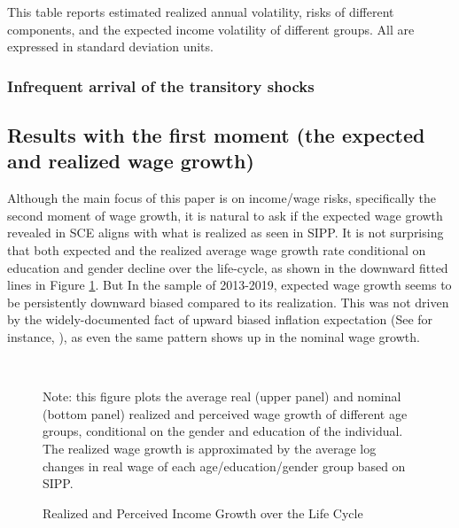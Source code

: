 \begin{table}
{}
	\begin{flushleft} This table reports estimated realized annual volatility, risks of different components, and the expected income volatility of different groups. All are expressed in standard deviation units.\end{flushleft}
\end{table}


\subsubsection{Infrequent arrival of the transitory shocks}

\subsection{Results with the first moment (the expected and realized wage growth)}

Although the main focus of this paper is on income/wage risks, specifically the second moment of wage growth, it is natural to ask if the expected wage growth revealed in SCE aligns with what is realized as seen in SIPP. It is not surprising that both expected and the realized average wage growth rate conditional on education and gender decline over the life-cycle, as shown in the downward fitted lines in Figure \ref{fig:growth_age_compare}. But In the sample of 2013-2019, expected wage growth seems to be persistently downward biased compared to its realization. This was not driven by the widely-documented fact of upward biased inflation expectation (See for instance, \cite{wang2021infvar}), as even the same pattern shows up in the nominal wage growth.

 \begin{figure}[!ht]
    	\caption{Realized and Perceived Income Growth over the Life Cycle}
    	\label{fig:growth_age_compare}
    	\begin{center}
    	 \\
    	\medskip
    	\end{center}
    	\begin{flushleft} Note: this figure plots the average real (upper panel) and nominal (bottom panel) realized and perceived wage growth of different age groups, conditional on the gender and education of the individual. The realized wage growth is approximated by the average log changes in real wage of each age/education/gender group based on SIPP.\end{flushleft}
    \end{figure}
    
